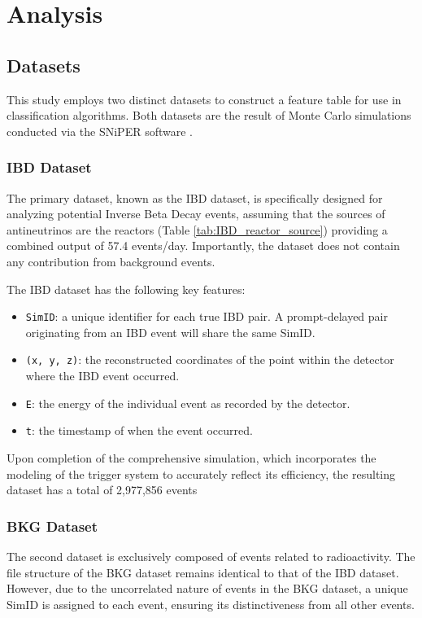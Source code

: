 \chapter{Analysis}

\section{Datasets}
This study employs two distinct datasets to construct a feature table for use in classification algorithms. Both datasets are the result of Monte Carlo simulations conducted via the SNiPER software \cite{sniper}.

\subsection*{IBD Dataset}
The primary dataset, known as the IBD dataset, is specifically designed for analyzing potential Inverse Beta Decay events, assuming that the sources of antineutrinos are the reactors (Table \ref{tab:IBD_reactor_source}) providing a combined output of 57.4 events/day. Importantly, the dataset does not contain any contribution from background events.

The IBD dataset has the following key features:

\begin{small}
\begin{itemize}
	\item \texttt{SimID}: a unique identifier for each true IBD pair. A prompt-delayed pair originating from an IBD event will share the same SimID.
	\item \texttt{(x, y, z)}: the reconstructed coordinates of the point within the detector where the IBD event occurred.
	\item \texttt{E}: the energy of the individual event as recorded by the detector.
	\item \texttt{t}: the timestamp of when the event occurred.
\end{itemize}
\end{small}

Upon completion of the comprehensive simulation, which incorporates the modeling of the trigger system to accurately reflect its efficiency, the resulting dataset has a total of 2,977,856 events

\subsection*{BKG Dataset}
The second dataset is exclusively composed of events related to radioactivity. 
The file structure of the BKG dataset remains identical to that of the IBD dataset. However, due to the uncorrelated nature of events in the BKG dataset, a unique SimID is assigned to each event, ensuring its distinctiveness from all other events. 

